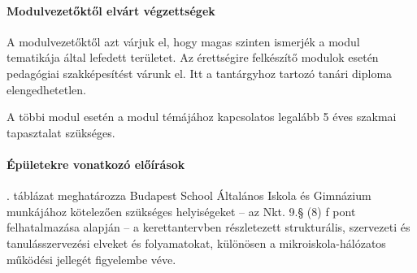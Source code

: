 \paragraph{Modulvezetőktől elvárt végzettségek}
A modulvezetőktől azt várjuk el, hogy magas szinten ismerjék a modul tematikája
által lefedett területet. Az érettségire
felkészítő modulok esetén pedagógiai szakképesítést várunk el. Itt a
tantárgyhoz tartozó tanári diploma
elengedhetetlen.

A többi modul esetén a modul témájához kapcsolatos legalább 5 éves szakmai
tapasztalat szükséges.

\paragraph{Épületekre vonatkozó előírások}
. táblázat meghatározza Budapest School Általános Iskola
és Gimnázium munkájához kötelezően szükséges helyiségeket -- az Nkt. 9.§ (8) f
pont felhatalmazása alapján -- a kerettantervben részletezett strukturális,
szervezeti és tanulásszervezési elveket és folyamatokat, különösen a
mikroiskola-hálózatos működési jellegét figyelembe véve.

